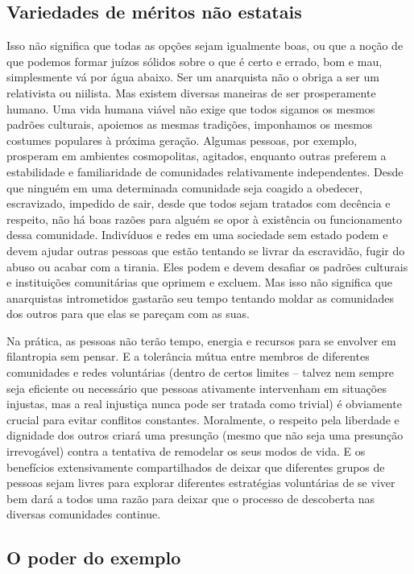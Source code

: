 \subsection*{Variedades de méritos não estatais}

Isso não significa que todas as opções sejam igualmente boas, ou que a noção de que podemos formar juízos sólidos sobre o que é certo e errado, bom e mau, simplesmente vá por água abaixo. Ser um anarquista não o obriga a ser um relativista ou niilista. Mas existem diversas maneiras de ser prosperamente humano. Uma vida humana viável não exige que todos sigamos os mesmos padrões culturais, apoiemos as mesmas tradições, imponhamos os mesmos costumes populares à próxima geração. Algumas pessoas, por exemplo, prosperam em ambientes cosmopolitas, agitados, enquanto outras preferem a estabilidade e familiaridade de comunidades relativamente independentes. Desde que ninguém em uma determinada comunidade seja coagido a obedecer, escravizado, impedido de sair, desde que todos sejam tratados com decência e respeito, não há boas razões para alguém se opor à existência ou funcionamento dessa comunidade. Indivíduos e redes em uma sociedade sem estado podem e devem ajudar outras pessoas que estão tentando se livrar da escravidão, fugir do abuso ou acabar com a tirania. Eles podem e devem desafiar os padrões culturais e instituições comunitárias que oprimem e excluem. Mas isso não significa que anarquistas intrometidos gastarão seu tempo tentando moldar as comunidades dos outros para que elas se pareçam com as suas.

Na prática, as pessoas não terão tempo, energia e recursos para se envolver em filantropia sem pensar. E a tolerância mútua entre membros de diferentes comunidades e redes voluntárias (dentro de certos limites -- talvez nem sempre seja eficiente ou necessário que pessoas ativamente intervenham em situações injustas, mas a real injustiça nunca pode ser tratada como trivial) é obviamente crucial para evitar conflitos constantes. Moralmente, o respeito pela liberdade e dignidade dos outros criará uma presunção (mesmo que não seja uma presunção irrevogável) contra a tentativa de remodelar os seus modos de vida. E os benefícios extensivamente compartilhados de deixar que diferentes grupos de pessoas sejam livres para explorar diferentes estratégias voluntárias de se viver bem dará a todos uma razão para deixar que o processo de descoberta nas diversas comunidades continue.

\subsection*{O poder do exemplo}

